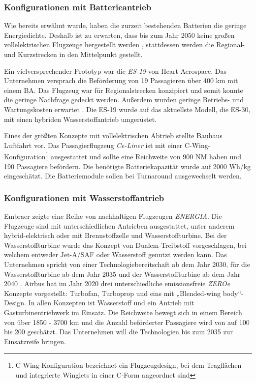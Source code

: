\subsubsection{Konfigurationen mit Batterieantrieb}

Wie bereits erwähnt wurde, haben die zurzeit bestehenden Batterien die geringe Energiedichte. 
Deshalb ist zu erwarten, dass bis zum Jahr 2050 keine großen vollelektrischen Flugzeuge hergestellt werden \cite{mukhopadhaya2022performance}, 
stattdessen werden die Regional- und Kurzstrecken in den Mittelpunkt gestellt.

Ein vielversprechender Prototyp war die \textit{ES-19} von Heart Aerospace. 
Das Unternehmen versprach die Beförderung von 19 Passagieren über 400 km mit einem BA. 
Das Flugzeug war für Regionalstrecken konzipiert und 
somit konnte die geringe Nachfrage gedeckt werden. 
Außerdem wurden geringe Betriebs- und Wartungskosten erwartet \cite{dalmia2022powering}.
Die ES-19 wurde auf das aktuellste Modell, die ES-30, 
mit einen hybriden Wasserstoffantrieb umgerüstet.

Eines der größten Konzepte mit vollelektrischen Abtrieb stellte Bauhaus Luftfahrt vor. 
Das Passagierflugzeug \textit{Ce-Liner} \cite{BauhausLuftfahrt} ist mit einer 
C-Wing-Konfiguration\footnote{C-Wing-Konfiguration bezeichnet ein Flugzeugdesign, bei dem Tragflächen und integrierte Winglets in einer C-Form angeordnet sind}
ausgestattet und sollte eine Reichweite von 900 NM haben und 190 Passagiere befördern. 
Die benötigte Batteriekapazität wurde auf 2000 Wh/kg eingeschätzt. 
Die Batteriemodule sollen bei Turnaround ausgewechselt werden.

\subsubsection{Konfigurationen mit Wasserstoffantrieb}

Embraer zeigte eine Reihe von nachhaltigen Flugzeugen \textit{ENERGIA}. 
Die Flugzeuge sind mit unterschiedlichen Antrieben ausgestattet, 
unter anderem hybrid-elektrisch oder mit Brennstoffzelle und Wasserstoffturbine. 
Bei der Wasserstoffturbine wurde das Konzept von Dualem-Treibstoff vorgeschlagen, 
bei welchem entweder Jet-A/SAF oder Wasserstoff genutzt werden kann. 
Das Unternehmen spricht von einer Technologiebereitschaft ab dem Jahr 2030, 
für die Wasserstoffturbine ab dem Jahr 2035 und der Wasserstoffturbine ab dem Jahr 2040 \cite{embraer_energia_2021}. %
%
Airbus \cite{airbus_zea_concepts} hat im Jahr 2020 drei unterschiedliche 
emissionsfreie \textit{ZEROe} Konzepte vorgestellt: Turbofan, Turboprop und eins mit „Blended-wing body“-Design.
In allen Konzepten ist Wasserstoff und ein Antrieb mit Gasturbinentriebwerk im Einsatz. 
Die Reichweite bewegt sich in einem Bereich von über 1850 - 3700 km 
und die Anzahl beförderter Passagiere wird von auf 100 bis 200 geschätzt. 
Das Unternehmen will die Technologien bis zum 2035 zur Einsatzreife bringen.

